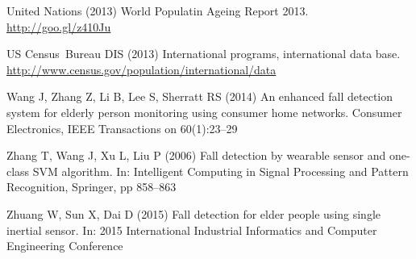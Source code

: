 \documentclass[twocolumn]{svjour3}          \smartqed  \usepackage[draft]{hyperref}
\begin{document}
\begin{thebibliography}{41}
{United Nations} (2013) {World Populatin Ageing Report 2013}.
  \urlprefix\url{http://goo.gl/z410Ju}

{US} Census~Bureau DIS (2013) International programs, international data base.
  \urlprefix\url{http://www.census.gov/population/international/data}

Wang J, Zhang Z, Li B, Lee S, Sherratt RS (2014) An enhanced fall detection
  system for elderly person monitoring using consumer home networks. Consumer
  Electronics, IEEE Transactions on 60(1):23--29

Zhang T, Wang J, Xu L, Liu P (2006) Fall detection by wearable sensor and
  one-class {SVM} algorithm. In: Intelligent {Computing} in {Signal}
  {Processing} and {Pattern} {Recognition}, Springer, pp 858--863

Zhuang W, Sun X, Dai D (2015) Fall detection for elder people using single
  inertial sensor. In: 2015 International Industrial Informatics and Computer
  Engineering Conference

\end{thebibliography}
\end{document}
